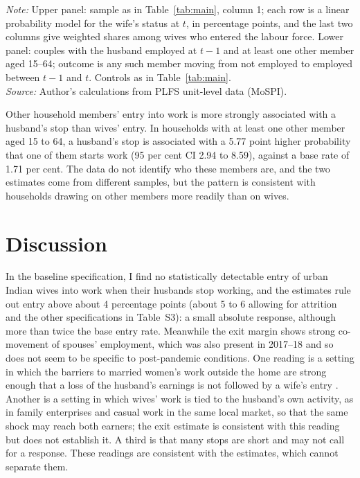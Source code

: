 \begin{table}[htbp]
\centering
\caption{Type of entry and responses of other household members}
\label{tab:qual}
\scriptsize
\begin{minipage}{\linewidth}\footnotesize\vspace{4pt}
\textit{Note:} Upper panel: sample as in Table~\ref{tab:main}, column 1; each row is a linear probability model for the wife's status at $t$, in percentage points, and the last two columns give weighted shares among wives who entered the labour force. Lower panel: couples with the husband employed at $t-1$ and at least one other member aged 15--64; outcome is any such member moving from not employed to employed between $t-1$ and $t$. Controls as in Table~\ref{tab:main}.\\
\textit{Source:} Author's calculations from PLFS unit-level data (MoSPI).
\end{minipage}
\end{table}

Other household members' entry into work is more strongly associated with a husband's stop than wives' entry. In households with at least one other member aged 15 to 64, a husband's stop is associated with a 5.77 point higher probability that one of them starts work (95 per cent CI 2.94 to 8.59), against a base rate of 1.71 per cent. The data do not identify who these members are, and the two estimates come from different samples, but the pattern is consistent with households drawing on other members more readily than on wives.

\section{Discussion}

In the baseline specification, I find no statistically detectable entry of urban Indian wives into work when their husbands stop working, and the estimates rule out entry above about 4 percentage points (about 5 to 6 allowing for attrition and the other specifications in Table~S3): a small absolute response, although more than twice the base entry rate. Meanwhile the exit margin shows strong co-movement of spouses' employment, which was also present in 2017--18 and so does not seem to be specific to post-pandemic conditions. One reading is a setting in which the barriers to married women's work outside the home are strong enough that a loss of the husband's earnings is not followed by a wife's entry \citep{klasen2015,jayachandran2021}. Another is a setting in which wives' work is tied to the husband's own activity, as in family enterprises and casual work in the same local market, so that the same shock may reach both earners; the exit estimate is consistent with this reading but does not establish it. A third is that many stops are short and may not call for a response. These readings are consistent with the estimates, which cannot separate them.

